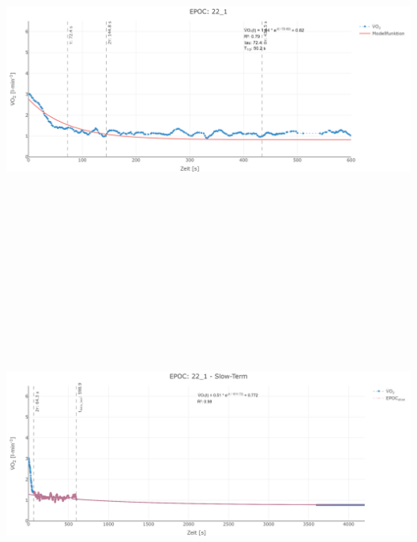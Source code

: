 \documentclass[
  letterpaper,
  DIV=11]{scrartcl}
\begin{document}
\includegraphics[width=11.45833in,height=4.6875in]{images/22_1_tau.png}
\includegraphics[width=11.45833in,height=4.6875in]{images/22_1_slow.png}
\end{document}
